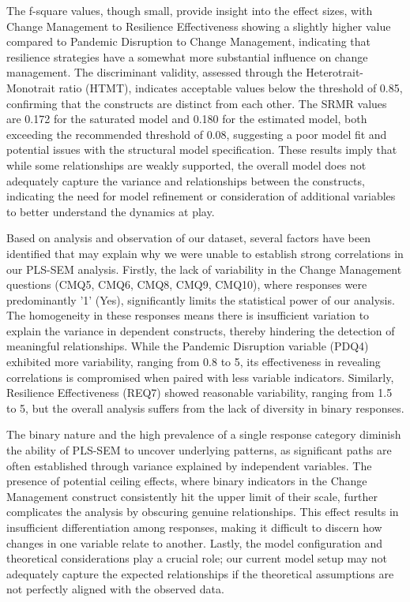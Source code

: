 The f-square values, though small, provide insight into the effect sizes, with Change Management to Resilience Effectiveness showing a slightly higher value compared to Pandemic Disruption to Change Management, indicating that resilience strategies have a somewhat more substantial influence on change management. The discriminant validity, assessed through the Heterotrait-Monotrait ratio (HTMT), indicates acceptable values below the threshold of 0.85, confirming that the constructs are distinct from each other. The SRMR values are 0.172 for the saturated model and 0.180 for the estimated model, both exceeding the recommended threshold of 0.08, suggesting a poor model fit and potential issues with the structural model specification. These results imply that while some relationships are weakly supported, the overall model does not adequately capture the variance and relationships between the constructs, indicating the need for model refinement or consideration of additional variables to better understand the dynamics at play.

Based on analysis and observation of our dataset, several factors have been identified that may explain why we were unable to establish strong correlations in our PLS-SEM analysis. Firstly, the lack of variability in the Change Management questions (CMQ5, CMQ6, CMQ8, CMQ9, CMQ10), where responses were predominantly '1' (Yes), significantly limits the statistical power of our analysis. The homogeneity in these responses means there is insufficient variation to explain the variance in dependent constructs, thereby hindering the detection of meaningful relationships. While the Pandemic Disruption variable (PDQ4) exhibited more variability, ranging from 0.8 to 5, its effectiveness in revealing correlations is compromised when paired with less variable indicators. Similarly, Resilience Effectiveness (REQ7) showed reasonable variability, ranging from 1.5 to 5, but the overall analysis suffers from the lack of diversity in binary responses. 

The binary nature and the high prevalence of a single response category diminish the ability of PLS-SEM to uncover underlying patterns, as significant paths are often established through variance explained by independent variables. The presence of potential ceiling effects, where binary indicators in the Change Management construct consistently hit the upper limit of their scale, further complicates the analysis by obscuring genuine relationships. This effect results in insufficient differentiation among responses, making it difficult to discern how changes in one variable relate to another. Lastly, the model configuration and theoretical considerations play a crucial role; our current model setup may not adequately capture the expected relationships if the theoretical assumptions are not perfectly aligned with the observed data. 

